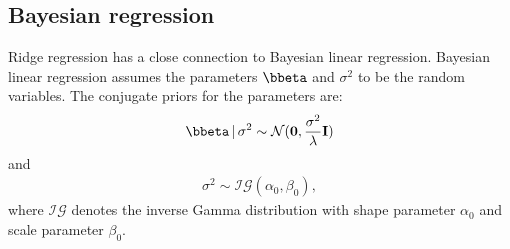 \documentclass[a4paper]{article}
\theoremstyle{myexamplestyle}
\begin{document}
\subsection{Bayesian regression}
Ridge regression has a close connection to Bayesian linear regression. Bayesian linear regression assumes the parameters $\bbeta$ and $\sigma^2$ to be the random variables.
The conjugate priors for the parameters are:
\begin{eqnarray*}
\bbeta \, | \, \sigma^2 \sim \mathcal{N}(\mathbf{0}, \frac{\sigma^2}{\lambda} \mathbf{I})
\end{eqnarray*}
and
\begin{eqnarray*}
\sigma^2 \sim \mathcal{IG}(\alpha_0, \beta_0),
\end{eqnarray*}
where $\mathcal{IG}$ denotes the inverse Gamma distribution with shape parameter $\alpha_0$ and scale parameter $\beta_0$. 
\end{document}
